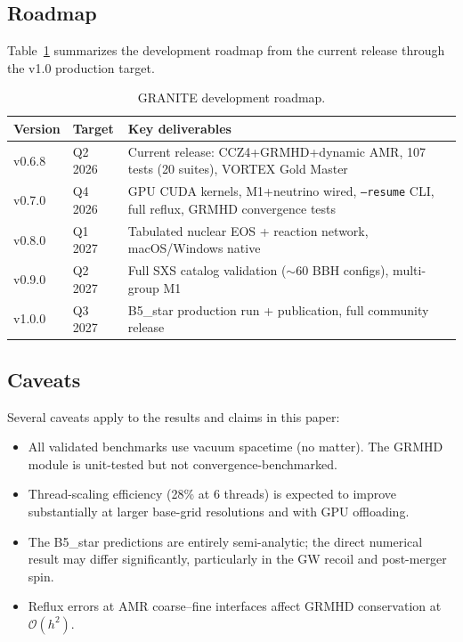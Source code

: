 \documentclass[aps,prd,twocolumn,superscriptaddress,nofootinbib,showpacs,
               longbibliography]{revtex4-2}
\newcommand{\code}[1]{\texttt{#1}}
\newcommand{\order}[1]{\mathcal{O}(#1)}
\begin{document}
\subsection{Roadmap}

Table~\ref{tab:roadmap} summarizes the development roadmap from the current
release through the v1.0 production target.

\begin{table}[t]
\caption{GRANITE development roadmap.}
\label{tab:roadmap}
\begin{ruledtabular}
\begin{tabular}{llp{4.5cm}}
  Version & Target & Key deliverables \\ \hline
  v0.6.8 & Q2 2026 & Current release: CCZ4+GRMHD+dynamic AMR, 107 tests (20 suites), VORTEX Gold Master \\
  v0.7.0 & Q4 2026 & GPU CUDA kernels, M1+neutrino wired, \code{--resume} CLI, full reflux, GRMHD convergence tests \\
  v0.8.0 & Q1 2027 & Tabulated nuclear EOS + reaction network, macOS/Windows native \\
  v0.9.0 & Q2 2027 & Full SXS catalog validation (${\sim}60$ BBH configs), multi-group M1 \\
  v1.0.0 & Q3 2027 & B5\_star production run + publication, full community release \\
\end{tabular}
\end{ruledtabular}
\end{table}

\subsection{Caveats}

Several caveats apply to the results and claims in this paper:
\begin{itemize}[nosep]
  \item All validated benchmarks use vacuum spacetime (no matter).
    The GRMHD module is unit-tested but not convergence-benchmarked.
  \item Thread-scaling efficiency (28\% at 6 threads) is expected to improve
    substantially at larger base-grid resolutions and with GPU offloading.
  \item The B5\_star predictions are entirely semi-analytic; the direct
    numerical result may differ significantly, particularly in the GW
    recoil and post-merger spin.
  \item Reflux errors at AMR coarse--fine interfaces affect GRMHD
    conservation at $\order{h^2}$.
\end{itemize}
\end{document}
